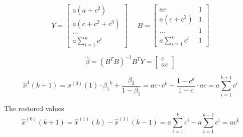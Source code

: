 \documentclass[a4paper,11pt]{article}
\begin{document}
\begin{equation}
Y=\begin{bmatrix}
a(a+c^2)\\ 
a(c+c^2+c^3)\\ 
...\\ 
a\sum_{i=1}^{n}c^i
\end{bmatrix} ~~~~~~B=\begin{bmatrix}
ac & 1\\ 
 a(c+c^2)& 1\\ 
 ...&1 \\ 
 a\sum_{i=1}^{n}c^i&1 
\end{bmatrix}
\end{equation}

\begin{equation}
\hat{\beta}={(B^{T}B)}^{-1}B^{T}Y=\begin{bmatrix}
c\\ 
ac
\end{bmatrix}
\end{equation}

\begin{equation}
{\hat{x}}^{1}(k+1)=x^{(0)}(1)\cdot {\beta_1}^{k}+\frac{\beta _2}{1-\beta _1}=ac\cdot c^k+\frac{1-c^k}{1-c}\cdot ac=a\sum_{i=1}^{k+1}c^i
\end{equation}

The restored values
\begin{equation}
{\hat{x}}^{(0)}(k+1)={\hat{x}}^{(1)}(k)-{\hat{x}}^{(1)}(k-1)=a\sum_{i=1}^{k}c^i-a\sum_{i=1}^{k-1}c^i=ac^k
\end{equation}
\end{document}
